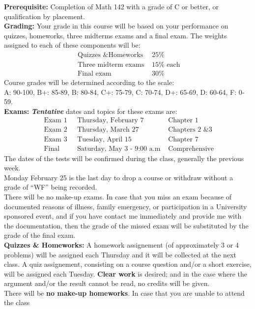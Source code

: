 \documentclass[11pt]{amsart}
\begin{document}
{\bf Prerequisite:} Completion of Math 142 with a grade of C or better, or qualification by placement.\\[0.3cm]
{\bf Grading:} Your grade in this course will be based on your performance on  quizzes, homeworks, three midterms 
exams and a final exam. The weights assigned to each of these components will be:
\[
\begin{array} {ll}
\mbox{ Quizzes \& Homeworks } & 25 \% \\
\mbox{ Three midterm exams } & 15 \% \mbox{ each} \\
\mbox{ Final exam } & 30 \%
\end{array}
\]
Course grades will be determined according to the scale:\\
A: 90-100, B+: 85-89, B: 80-84, C+: 75-79, C: 70-74, D+: 65-69, D: 60-64, F: 0-59.\\[0.3cm]
{\bf Exams:} {\em \bf Tentative} dates and topics for these exams are:
\[
\begin{array}{lll}
\mbox{ Exam 1 } & \mbox{ Thursday, February 7} & \mbox{ Chapter } 1 \\
\mbox{ Exam 2 } & \mbox{ Thursday, March 27} & \mbox{ Chapters 2 \& 3}\\
\mbox{ Exam 3 } & \mbox{ Tuesday, April 15} & \mbox{ Chapter } 7\\
\mbox{ Final} & \mbox{ Saturday, May 3 - 9:00 a.m}  & \mbox{ Comprehensive}
\end{array}
\]
The dates of the tests will be confirmed during the class, generally the previous week.\\
Monday February 25 is the last day to drop a course or withdraw without a grade of ``WF'' being recorded.\\
There will be no make-up exams. In case that you miss an exam because of  documented reasons of illness, family
emergency, or participation in a University sponsored event, and if you have contact me immediately and provide me 
with the documentation, then the grade of the missed exam will be substituted by the grade of the final 
exam.\\[0.3cm]
{\bf Quizzes \& Homeworks:} A homework assignement (of approximately 3 or 4
problems) will be assigned each Thursday and it will be collected at the next class. A quiz assignement, consisting on a course question and/or a short exercise, will be assigned each Tuesday. \textbf{Clear work} is desired; and in the case where the argument and/or the result cannot be read, no credits will be given.\\
There will be  \textbf{no make-up homeworks}. In case that you are unable to attend the class
\end{document}
